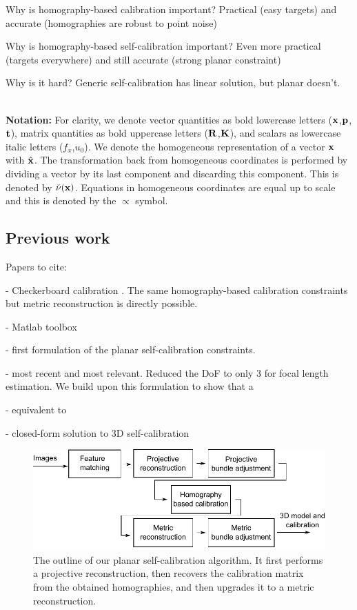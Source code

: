 \documentclass[10pt,twocolumn,letterpaper]{article}
\begin{document}
Why is homography-based calibration important? Practical (easy targets) and accurate (homographies are robust to point noise)

Why is homography-based self-calibration important? Even more practical (targets everywhere) and still accurate (strong planar constraint)

Why is it hard? Generic self-calibration has linear solution, but planar doesn't.

~\\ \noindent\textbf{Notation:}
For clarity, we denote vector quantities as bold lowercase letters (\eg $\mathbf{x}$,$\mathbf{p}$,$\mathbf{t}$), matrix quantities as bold uppercase letters (\eg $\mathbf{R}$,$\mathbf{K}$), and scalars as lowercase italic letters (\eg $f_x$,$u_0$). We denote the homogeneous representation of a vector $\mathbf{x}$ with $\hat{\mathbf{x}}$. The transformation back from homogeneous coordinates is performed by dividing a vector by its last component and discarding this component. This is denoted by $\check{\nu}(\mathbf{x})$. Equations in homogeneous coordinates are equal up to scale and this is denoted by the $\propto$ symbol.

\subsection{Previous work}

Papers to cite:

- Checkerboard calibration \cite{zhang1999}. The same homography-based calibration constraints but metric reconstruction is directly possible.

- Matlab toolbox \cite{bouguetMCT}

- \cite{triggs1998} first formulation of the planar self-calibration constraints.

- \cite{bocquillon2006} most recent and most relevant. Reduced the DoF to only 3 for focal length estimation. We build upon this formulation to show that a

- \cite{gurdjos2003} equivalent to \cite{bocquillon2006}

- \cite{bougnoux1998} closed-form solution to 3D self-calibration

\begin{figure}
\includegraphics[width=\linewidth]{images/pipeline.pdf}
\caption{The outline of our planar self-calibration algorithm. It first performs a projective reconstruction, then recovers the calibration matrix from the obtained homographies, and then upgrades it to a metric reconstruction.}
\label{fig:diagram}
\end{figure}
\end{document}
